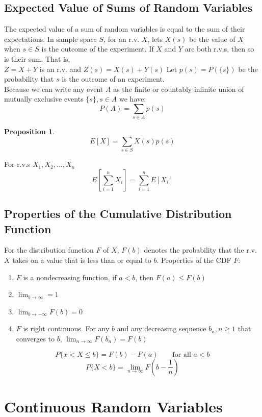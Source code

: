 \documentclass[openany]{book}
\numberwithin{equation}{section}
\newtheorem{proposition}{Proposition}[section]
\begin{document}
\begin{flushleft}
\section{Expected Value of Sums of Random Variables}
The expected value of a sum of random variables is equal to the sum of their expectations.\medbreak
In sample space $S$, for an r.v. $X$, lets $X(s)$ be the value of $X$ when $s\in S$ is the outcome of the experiment. If $X$ and $Y$ are both r.v.s, then so is their sum. That is,\\
$Z=X+Y$ is an r.v. and $Z(s)=X(s)+Y(s)$\medbreak
Let $p(s)=P(\{s\})$ be the probability that $s$ is the outcome of an experiment.\\
Because we can write any event $A$ as the finite or countably infinite union of mutually exclusive events $\{s\},s\in A$ we have:
\[P(A)=\sum_{s\in A}p(s)
\]
\begin{proposition}
	\label{p4.9.1}
	\[E[X]=\sum_{s\in S}X(s)p(s)\]
\end{proposition}
For r.v.s $X_1,X_2,\dots,X_n$
\[E \left[\sum_{i=1}^{n}X_i\right]=\sum_{i=1}^{n}E[X_i]
\]
\section{Properties of the Cumulative Distribution Function}
For the distribution function $F$ of $X$, $F(b)$ denotes the probability that the r.v. $X$ takes on a value that is less than or equal to $b$.\medbreak
Properties of the CDF $F$:
\begin{enumerate}
\item $F$ is a nondecreasing function, if $a<b$, then $F(a)\leq F(b)$
\item $\displaystyle \lim_{b\to \infty}=1$
\item  $\displaystyle \lim_{b \to -\infty}F(b)=0$
\item $F$ is right continuous. For any $b$ and any decreasing sequence $b_n,n\geq 1$ that converges to $b$, $\displaystyle \lim_{n \to \infty}F(b_n)=F(b)$
\end{enumerate}
\[P\{x<X\leq b\}=F(b)-F(a) \qquad \text{for all }a<b
\]
\[P\{X<b\}=\lim_{n \to \infty} F \left(b-\frac{1}{n}\right)
\]
\chapter{Continuous Random Variables}

\end{flushleft}
\end{document}
